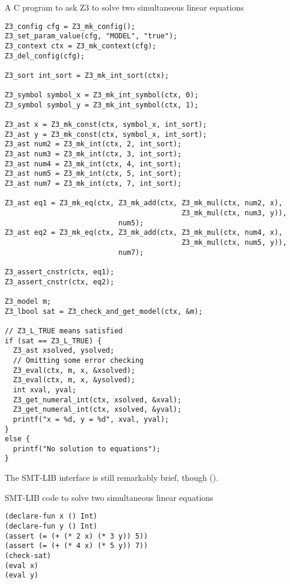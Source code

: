 \begin{program}
\caption{A C program to ask Z3 to solve two simultaneous linear equations}
\label{fig:c-simultaneous}
\begin{verbatim}
Z3_config cfg = Z3_mk_config();
Z3_set_param_value(cfg, "MODEL", "true");
Z3_context ctx = Z3_mk_context(cfg);
Z3_del_config(cfg);

Z3_sort int_sort = Z3_mk_int_sort(ctx);

Z3_symbol symbol_x = Z3_mk_int_symbol(ctx, 0);
Z3_symbol symbol_y = Z3_mk_int_symbol(ctx, 1);

Z3_ast x = Z3_mk_const(ctx, symbol_x, int_sort);
Z3_ast y = Z3_mk_const(ctx, symbol_x, int_sort);
Z3_ast num2 = Z3_mk_int(ctx, 2, int_sort);
Z3_ast num3 = Z3_mk_int(ctx, 3, int_sort);
Z3_ast num4 = Z3_mk_int(ctx, 4, int_sort);
Z3_ast num5 = Z3_mk_int(ctx, 5, int_sort);
Z3_ast num7 = Z3_mk_int(ctx, 7, int_sort);

Z3_ast eq1 = Z3_mk_eq(ctx, Z3_mk_add(ctx, Z3_mk_mul(ctx, num2, x),
                                          Z3_mk_mul(ctx, num3, y)),
                           num5);
Z3_ast eq2 = Z3_mk_eq(ctx, Z3_mk_add(ctx, Z3_mk_mul(ctx, num4, x),
                                          Z3_mk_mul(ctx, num5, y)),
                           num7);

Z3_assert_cnstr(ctx, eq1);
Z3_assert_cnstr(ctx, eq2);

Z3_model m;
Z3_lbool sat = Z3_check_and_get_model(ctx, &m);

// Z3_L_TRUE means satisfied
if (sat == Z3_L_TRUE) {
  Z3_ast xsolved, ysolved;
  // Omitting some error checking
  Z3_eval(ctx, m, x, &xsolved);
  Z3_eval(ctx, m, x, &ysolved);
  int xval, yval;
  Z3_get_numeral_int(ctx, xsolved, &xval);
  Z3_get_numeral_int(ctx, xsolved, &yval);
  printf("x = %d, y = %d", xval, yval);
}
else {
  printf("No solution to equations");
}
\end{verbatim}
\end{program}

The SMT-LIB interface is still remarkably brief, though ().

\begin{program}
\caption{SMT-LIB code to solve two simultaneous linear equations}
\label{fig:smtlib-simultaneous}
\begin{verbatim}
(declare-fun x () Int)
(declare-fun y () Int)
(assert (= (+ (* 2 x) (* 3 y)) 5))
(assert (= (+ (* 4 x) (* 5 y)) 7))
(check-sat)
(eval x)
(eval y)
\end{verbatim}
\end{program}

